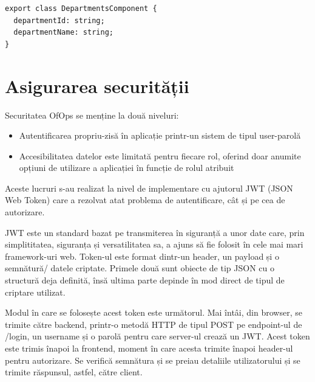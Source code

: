 \begin{center}
\begin{minipage}{0.8\textwidth}
\captionsetup{type=listing}
   \begin{lstlisting}
export class DepartmentsComponent {
  departmentId: string;
  departmentName: string;
}
\end{lstlisting} 
\end{minipage}
\end{center}

\vspace{1.5em}
\section{Asigurarea securității}

Securitatea OfOps se menține la două niveluri: \begin{itemize}[left=1.5cm]
    \item Autentificarea propriu-zisă în aplicație printr-un sistem de tipul user-parolă
    \item Accesibilitatea datelor este limitată pentru fiecare rol, oferind doar anumite opțiuni de utilizare a aplicației în funcție de rolul atribuit
\end{itemize}

Aceste lucruri s-au realizat la nivel de implementare cu ajutorul JWT (JSON Web Token) care a rezolvat atat problema de autentificare, cât și pe cea de autorizare. 

JWT este un standard bazat pe transmiterea în siguranță a unor date care, prin simplititatea, siguranța și versatilitatea sa, a ajuns să fie folosit în cele mai mari framework-uri web.\cite{citation6} Token-ul este format dintr-un header, un payload și o semnătură/ datele criptate. Primele două sunt obiecte de tip JSON cu o structură deja definită, însă ultima parte depinde în mod direct de tipul de criptare utilizat.

Modul în care se folosește acest token este următorul. Mai întâi, din browser, se trimite către backend, printr-o metodă HTTP de tipul POST pe endpoint-ul de /login, un username și o parolă pentru care server-ul crează un JWT. Acest token este trimis înapoi la frontend, moment în care acesta trimite înapoi header-ul pentru autorizare. Se verifică semnătura și se preiau detaliile utilizatorului și se trimite răspunsul, astfel, către client.
 

